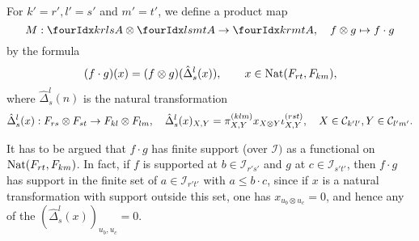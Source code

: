 
\begin{Def} For $k'=r', l'=s'$ and $m'=t'$, we define a product map \[M:\Gr{A}{k}{l}{r}{s} \otimes \Gr{A}{l}{m}{s}{t}\rightarrow  \Gr{A}{k}{m}{r}{t},\quad f\otimes g \mapsto f\cdot g\] by the formula \[(f\cdot g)(x) = (f\otimes g)( \hat{\Delta}^{l}_{s}(x)), \qquad  x \in \operatorname{\mathrm{Nat}}(F_{rt},F_{km}),\] where $\hat{\Delta}^l_s(n)$ is the natural transformation\[\hat{\Delta}^l_s(x):  F_{rs}\otimes F_{st}\rightarrow F_{kl}\otimes F_{lm},\quad \hat{\Delta}^l_s(x)_{X,Y} = \pi^{(klm)}_{X,Y}x_{X\otimes Y} \iota^{(rst)}_{X,Y},\quad X\in \mathcal{C}_{k'l'},Y\in \mathcal{C}_{l'm'}.\]
\end{Def}

\begin{Rem} It has to be argued that $f\cdot g$ has finite support (over $\mathcal{I})$ as a functional on $\operatorname{\mathrm{Nat}}(F_{rt},F_{km})$. In fact, if $f$ is supported at $b\in \mathcal{I}_{r's'}$ and $g$ at $c\in \mathcal{I}_{s't'}$, then $f\cdot g$ has support in the finite set of $a\in \mathcal{I}_{r't'}$ with $a\leq b\cdot c$, since if $x$ is a natural transformation with support outside this set, one has $x_{u_b\otimes u_c}=0$, and hence any of the $\left(\hat{\Delta}^l_s(x)\right)_{u_b,u_c} =0$.
\end{Rem}

